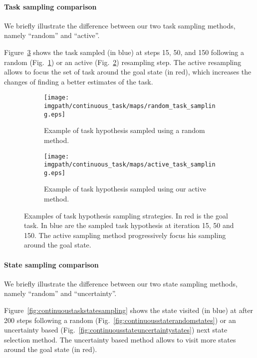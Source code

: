 \paragraph{Task sampling comparison}

We briefly illustrate the difference between our two task sampling methods, namely ``random'' and ``active''.

Figure~\ref{fig:continuoustasktasksampling} shows the task sampled (in blue) at steps 15, 50, and 150 following a random (Fig.~\ref{fig:continuoustaskrandomtask}) or an active (Fig.~\ref{fig:continuoustaskactivetask}) resampling step. The active resampling allows to focus the set of task around the goal state (in red), which increases the changes of finding a better estimates of the task.

\begin{figure}[!htbp]
\centering
    \begin{subfigure}[b]{\columnwidth}
        \centering
        \texttt{[image: \\imgpath/continuous\_task/maps/random\_task\_sampling.eps]}
        \caption{Example of task hypothesis sampled using a random method.}
        \label{fig:continuoustaskrandomtask}
    \end{subfigure}
    \begin{subfigure}[b]{\columnwidth}
        \centering
        \texttt{[image: \\imgpath/continuous\_task/maps/active\_task\_sampling.eps]}
        \caption{Example of task hypothesis sampled using our active method.}
        \label{fig:continuoustaskactivetask}
    \end{subfigure}
\caption{Examples of task hypothesis sampling strategies. In red is the goal task. In blue are the sampled task hypothesis at iteration 15, 50 and 150. The active sampling method progressively focus his sampling around the goal state.}
\label{fig:continuoustasktasksampling}
\end{figure}

\newpage

\paragraph{State sampling comparison}

We briefly illustrate the difference between our two state sampling methods, namely ``random'' and ``uncertainty''.

Figure~\ref{fig:continuoustaskstatesampling} shows the state visited (in blue) at after 200 steps  following a random (Fig.~\ref{fig:continuousstaterandomstates}) or an uncertainty based (Fig.~\ref{fig:continuousstateuncertaintystates}) next state selection method. The uncertainty based method allows to visit more states around the goal state (in red).


